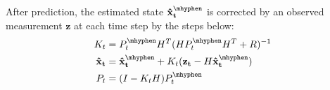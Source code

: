 


After prediction, the estimated state $\mathbf{\hat{x}^{\mhyphen}_t}$ is corrected by an observed measurement $\mathbf{z}$ at each time step by the steps below: 
\begin{align}
\begin{split}
K_t & = P^{\mhyphen}_t H^T(HP^{\mhyphen}_t H^T+R)^{-1}\\
\mathbf{\hat{x}_t} & = \mathbf{\hat{x}^{\mhyphen}_t} + K_t(\mathbf{z_t} - H\mathbf{\hat{x}^{\mhyphen}_t)}\\
P_t & = (I-K_tH)P^{\mhyphen}_t
\end{split}
\label{eq:kf-correct}
\end{align}


